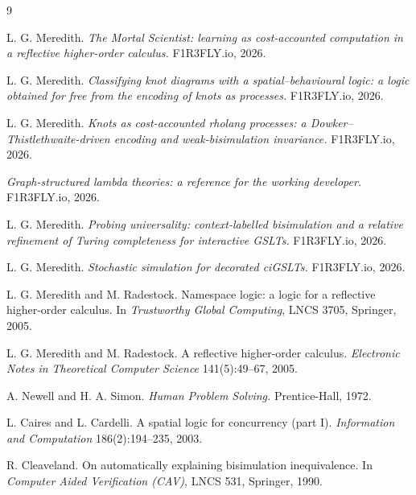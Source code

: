 \documentclass[11pt]{article}
\theoremstyle{definition}
\theoremstyle{plain}
\theoremstyle{remark}
\begin{document}
\begin{thebibliography}{9}

 L. G. Meredith. \emph{The Mortal Scientist: learning as
cost-accounted computation in a reflective higher-order calculus.} F1R3FLY.io,
2026.

 L. G. Meredith. \emph{Classifying knot diagrams with a
spatial--behavioural logic: a logic obtained for free from the encoding of knots
as processes.} F1R3FLY.io, 2026.

 L. G. Meredith. \emph{Knots as cost-accounted rholang processes:
a Dowker--Thistlethwaite-driven encoding and weak-bisimulation invariance.}
F1R3FLY.io, 2026.

 \emph{Graph-structured lambda theories: a reference for the
working developer.} F1R3FLY.io, 2026.

 L. G. Meredith. \emph{Probing universality: context-labelled
bisimulation and a relative refinement of Turing completeness for interactive
GSLTs.} F1R3FLY.io, 2026.

 L. G. Meredith. \emph{Stochastic simulation for decorated
ciGSLTs.} F1R3FLY.io, 2026.

 L. G. Meredith and M. Radestock. Namespace logic: a logic for
a reflective higher-order calculus. In \emph{Trustworthy Global Computing},
LNCS 3705, Springer, 2005.

 L. G. Meredith and M. Radestock. A reflective higher-order
calculus. \emph{Electronic Notes in Theoretical Computer Science}
141(5):49--67, 2005.

 A. Newell and H. A. Simon. \emph{Human Problem Solving.}
Prentice-Hall, 1972.

 L. Caires and L. Cardelli. A spatial logic for concurrency
(part I). \emph{Information and Computation} 186(2):194--235, 2003.

 R. Cleaveland. On automatically explaining bisimulation
inequivalence. In \emph{Computer Aided Verification (CAV)}, LNCS 531, Springer,
1990.

\end{thebibliography}
\end{document}
